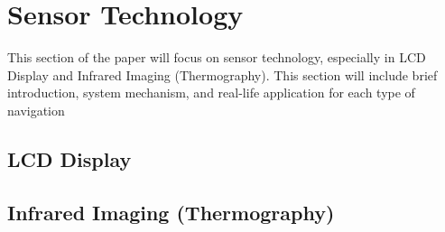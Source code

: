 \newpage
\justifying
\noindent

\section{Sensor Technology}
This section of the paper will focus on sensor technology, especially in LCD Display and Infrared Imaging (Thermography). This section will include brief introduction, system mechanism, and real-life application for each type of navigation

\subsection{LCD Display}
\subsection{Infrared Imaging (Thermography)}